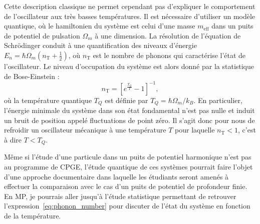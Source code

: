 \documentclass[12pt,a4paper]{article}
\newenvironment{mep}{%
\addcontentsline{ldf}{figure}{0}%
\begin{mep_env}
\small}
{\end{mep_env}}
\begin{document}
Cette description classique ne permet cependant pas d'expliquer le comportement de l'oscillateur aux très basses températures.
Il est nécessaire d'utiliser un modèle quantique, où le hamiltonien du système est celui d'une masse $m_\mathrm{eff}$ dans un puits de potentiel de pulsation $\Omega_m$ à une dimension.
La résolution de l'équation de Schrödinger conduit à une quantification des niveaux d'énergie $E_n = \hbar\Omega_m (n_\mathrm{T}+\frac{1}{2})$, où $n_\mathrm{T}$ est le nombre de phonons qui caractérise l'état de l'oscillateur.
Le niveau d'occupation du système est alors donné par la statistique de Bose-Einstein :
\begin{equation}
n_\mathrm{T} = \left[ e^\frac{T_Q}{T} -1\right]^{-1},
\label{eq:phonon_number}
\end{equation}
où la température quantique $T_Q$ est définie par $T_Q = \hbar\Omega_m/k_B$.
En particulier, l'énergie minimale du système dans son état fondamental n'est pas nulle et induit un bruit de position appelé \og fluctuations de point zéro\fg{}.
Il s'agit donc pour nous de refroidir un oscillateur mécanique à une température $T$ pour laquelle $n_\mathrm{T}<1$, c'est à dire $T<T_Q$.

\begin{mep}
Même si l'étude d'une particule dans un puits de potentiel harmonique n'est pas au programme de CPGE, l'étude quantique de ces systèmes pourrait faire l'objet d'une approche documentaire dans laquelle les étudiants seront amenés à effectuer la comparaison avec le cas d'un puits de potentiel de profondeur finie.
En MP, je pourrais aller jusqu'à l'étude statistique permettant de retrouver l'expression~\eqref{eq:phonon_number} pour discuter de l'état du système en fonction de la température.
\end{mep}
\end{document}

